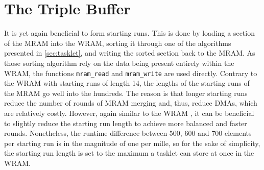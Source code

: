 \section{The Triple Buffer}
\label{sec:mram:triple}

It is yet again beneficial to form starting runs.
This is done by loading a section of the MRAM into the WRAM, sorting it through one of the algorithms presented in \cref{sec:tasklet}, and writing the sorted section back to the MRAM.
As those sorting algorithm rely on the data being present entirely within the WRAM, the functions \lstinline|mram_read| and \lstinline|mram_write| are used directly.
Contrary to the WRAM \MS*{} with starting runs of length 14, the lengths of the starting runs of the MRAM \MS{} go well into the hundreds.
The reason is that longer starting runs reduce the number of rounds of MRAM merging and, thus, reduce DMAs, which are relatively costly.
However, again similar to the WRAM \MS*{}, it can be beneficial to slightly reduce the starting run length to achieve more balanced and faster rounds.
Nonetheless, the runtime difference between 500, 600 and 700 elements per starting run is in the magnitude of one per mille, so for the sake of simplicity, the starting run length is set to the maximum a tasklet can store at once in the WRAM.


